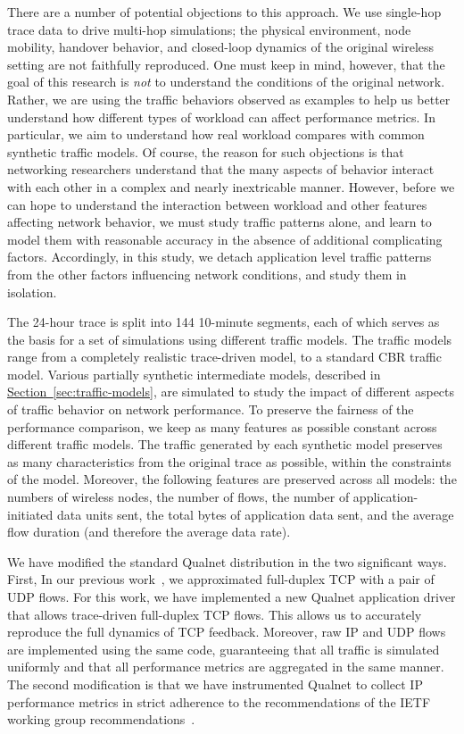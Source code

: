 \documentclass[conference]{IEEEtran}
\newcommand{\caps}[1]{{\small{#1}}}
\newcommand{\Section}[1]{\hyperref[sec:#1]{Section~\ref*{sec:#1}}}
\begin{document}
There are a number of potential objections to this approach. We use single-hop trace data to drive multi-hop simulations; the physical environment, node mobility, handover behavior, and closed-loop dynamics of the original wireless setting are not faithfully reproduced. One must keep in mind, however, that the goal of this research is \textit{not} to understand the conditions of the original network. Rather, we are using the traffic behaviors observed as examples to help us better understand how different types of workload can affect performance metrics. In particular, we aim to understand how real workload compares with common synthetic traffic models. Of course, the reason for such objections is that networking researchers understand that the many aspects of behavior interact with each other in a complex and nearly inextricable manner. However, before we can hope to understand the interaction between workload and other features affecting network behavior, we must study traffic patterns alone, and learn to model them with reasonable accuracy in the absence of additional complicating factors. Accordingly, in this study, we detach application level traffic patterns from the other factors influencing network conditions, and study them in isolation.

The 24-hour trace is split into 144 10-minute segments, each of which serves as the basis for a set of simulations using different traffic models. The traffic models range from a completely realistic trace-driven model, to a standard \caps{CBR} traffic model. Various partially synthetic intermediate models, described in \Section{traffic-models}, are simulated to study the impact of different aspects of traffic behavior on network performance. To preserve the fairness of the performance comparison, we keep as many features as possible constant across different traffic models. The traffic generated by each synthetic model preserves as many characteristics from the original trace as possible, within the constraints of the model. Moreover, the following features are preserved across all models: the numbers of wireless nodes, the number of flows, the number of application-initiated data units sent, the total bytes of application data sent, and the average flow duration (and therefore the average data rate).

We have modified the standard Qualnet distribution in the two significant ways. First, In our previous work~\cite{Karpinski07:realism,Karpinski07:cbr-failure}, we approximated full-duplex \caps{TCP} with a pair of \caps{UDP} flows. For this work, we have implemented a new Qualnet application driver that allows trace-driven full-duplex \caps{TCP} flows. This allows us to accurately reproduce the full dynamics of \caps{TCP} feedback. Moreover, raw \caps{IP} and \caps{UDP} flows are implemented using the same code, guaranteeing that all traffic is simulated uniformly and that all performance metrics are aggregated in the same manner. The second modification is that we have instrumented Qualnet to collect \caps{IP} performance metrics in strict adherence to the recommendations of the \caps{IETF} working group recommendations~\cite{rfc:ip-metrics,rfc:jitter}.
\end{document}
